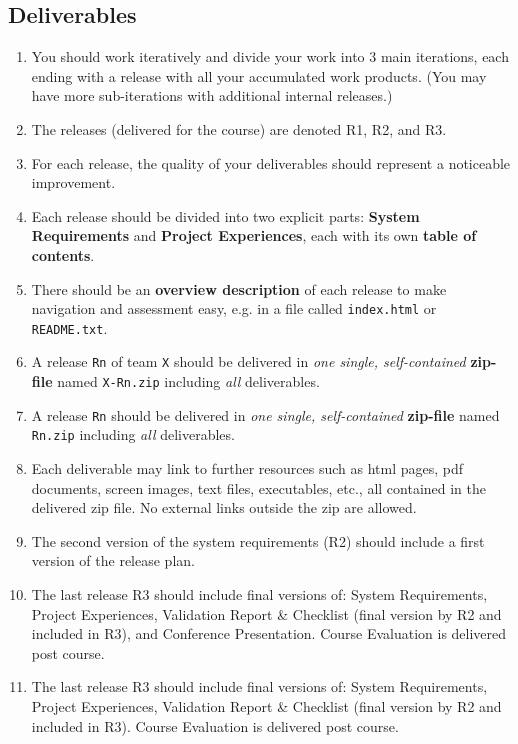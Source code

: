 \subsection{Deliverables}
  \begin{enumerate}[nolistsep]
    \item You should work iteratively and divide your work into 3 main iterations, each ending with a release with all your accumulated work products. (You may have more sub-iterations with additional internal releases.)
    \item The releases (delivered for the course) are denoted R1, R2, and R3.
    \item For each release, the quality of your deliverables should represent a noticeable improvement.
    \item Each release should be divided into two explicit parts: {\bf System Requirements} and {\bf Project Experiences}, each with its own {\bf table of contents}.
    \item There should be an {\bf overview description} of each release to make navigation and assessment easy, e.g. in a file called \verb+index.html+ or \verb+README.txt+.
\ifteknolog
    \item A release \verb+Rn+ of team \verb+X+ should be delivered in {\it one single, self-contained} {\bf zip-file} named \verb+X-Rn.zip+ including {\it all} deliverables.
\else
    \item A release \verb+Rn+ should be delivered in {\it one single, self-contained} {\bf zip-file} named \verb+Rn.zip+ including {\it all} deliverables.
\fi 
    \item Each deliverable may link to further resources such as html pages, pdf documents, screen images, text files, executables, etc., all contained in the delivered zip file. No external links outside the zip are allowed.
\ifteknolog
    \item The second version of the system requirements (R2) should include a first version of the release plan.
    \item The last release R3 should include final versions of: System Requirements, Project Experiences, Validation Report \& Checklist (final version by R2 and included in R3), and Conference Presentation. Course Evaluation is delivered post course.
\else
    \item The last release R3 should include final versions of: System Requirements, Project Experiences, Validation Report \& Checklist (final version by R2 and included in R3). Course Evaluation is delivered post course.
\fi


\end{enumerate}
